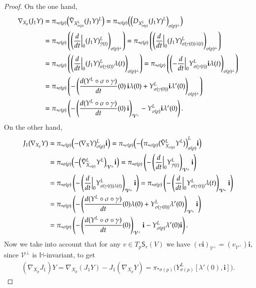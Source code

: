 \documentclass[12pt, a4paper]{amsart}
\renewcommand{\H}{\mathbb{H}}
\theoremstyle{remark}
\begin{document}
\begin{proof}
On the one hand,
\[
\begin{aligned}
\nabla_{X_p}(J_1 Y)
&{}=\pi_{*\sigma(p)}\Bigl(\tilde{\nabla}_{X_{\sigma(p)}^L}(J_1 Y)^L\Bigr)
=\pi_{*\sigma(p)}\Bigl(\Bigl(D_{X_{\sigma(p)}^L}(J_1 Y)^L\Bigr)_{\sigma(p)^\perp}\Bigr)\\
&{}=\pi_{*\sigma(p)}\left(
\left(\frac{d}{dt}\Big\vert_0 (J_1 Y)_{\tilde{\gamma}(t)}^L\right)_{\sigma(p)^\perp}\right)
=\pi_{*\sigma(p)}\left(
\left(\frac{d}{dt}\Big\vert_0 (J_1 Y)_{\sigma(\gamma(t))\lambda(t)}^L\right)_{\sigma(p)^\perp}\right)\\
&{}=\pi_{*\sigma(p)}\left(
\left(\frac{d}{dt}\Big\vert_0 (J_1 Y)_{\sigma(\gamma(t))}^L\lambda(t)\right)_{\sigma(p)^\perp}\right)
=\pi_{*\sigma(p)}\left(
\left(-\frac{d}{dt}\Big\vert_0 Y_{\sigma(\gamma(t))}^L\mathbf{i}\lambda(t)\right)_{\sigma(p)^\perp}\right)\\
&{}=\pi_{*\sigma(p)}\left(
-\left(\frac{d(Y^L\circ\sigma\circ\gamma)}{dt}(0)\,\mathbf{i}\lambda(0) +Y_{\sigma(\gamma(0))}^L\mathbf{i}\lambda'(0)\right)_{\sigma(p)^\perp}\right)\\
&{}=\pi_{*\sigma(p)}\left(
-\left(\frac{d(Y^L\circ\sigma\circ\gamma)}{dt}(0)\,\mathbf{i}\right)_{\mathcal{V}^\perp} -Y_{\sigma(p)}^L\mathbf{i}\lambda'(0)\right).
\end{aligned}
\]
On the other hand,
\[
\begin{aligned}
J_1(\nabla_{X_p}Y)
&{}=\pi_{*\sigma(p)}\Bigl(-(\nabla_X Y)_{\sigma(p)}^L\mathbf{i}\Bigr)
=\pi_{*\sigma(p)}\Bigl(
-\Bigl(\pi_{*\sigma(p)}(\tilde{\nabla}_{X_{\sigma(p)}}^L Y^L)\Bigr)_{\sigma(p)}^L\mathbf{i}\Bigr)\\
&{}=\pi_{*\sigma(p)}\Bigl(
-\Bigl(\tilde{\nabla}_{X_{\sigma(p)}}^L Y^L\Bigr)_{\mathcal{V}^\perp}\mathbf{i}\Bigr)
=\pi_{*\sigma(p)}\left(
-\left(\frac{d}{dt}\Big\vert_0 Y_{\tilde{\gamma}(t)}^L\right)_{\mathcal{V}^\perp}\mathbf{i}\right)\\
&{}=\pi_{*\sigma(p)}\left(
-\left(\frac{d}{dt}\Big\vert_0  Y_{\sigma(\gamma(t))\lambda(t)}^L\right)_{\mathcal{V}^\perp}\mathbf{i}\right)
=\pi_{*\sigma(p)}\left(
-\left(\frac{d}{dt}\Big\vert_0  Y_{\sigma(\gamma(t))}^L\lambda(t)\right)_{\mathcal{V}^\perp}\mathbf{i}\right)\\
&{}=\pi_{*\sigma(p)}\left(
-\left(\frac{d(Y^L\circ\sigma\circ\gamma)}{dt}(0)\lambda(0) +Y_{\sigma(\gamma(0))}^L\lambda'(0)\right)_{\mathcal{V}^\perp}\mathbf{i}\right)\\
&{}=\pi_{*\sigma(p)}\left(
-\left(\frac{d(Y^L\circ\sigma\circ\gamma)}{dt}(0)\right)_{\mathcal{V}^\perp}\mathbf{i} -Y_{\sigma(p)}^L\lambda'(0)\mathbf{i}\right).
\end{aligned}
\]
Now we take into account that for any $v\in T_p\mathsf{S}_r(V)$ we have 
$(v\mathbf{i})_{\mathcal{V}^\perp}=(v_{\mathcal{V}^\perp})\mathbf{i}$, since $\mathcal{V}^\perp$ is $\H$-invariant, to get
\[
\begin{aligned}
(\nabla_{X_p}J_1)Y
=\nabla_{X_p}(J_1 Y)-J_1(\nabla_{X_p}Y)
=\pi_{*\sigma(p)}\bigl(Y_{\sigma(p)}^L[\lambda'(0),\mathbf{i}]\bigr).
\end{aligned}
\]


\end{proof}
\end{document}
